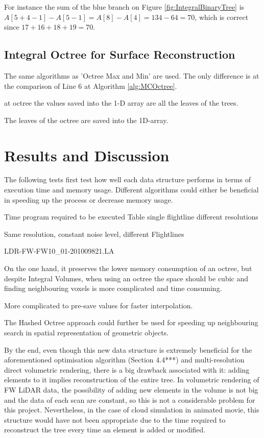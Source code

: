 \documentclass{subfiles}
\begin{document}
\par For instance the sum of the blue branch on Figure \ref{fig:IntegralBinaryTree} is $A[5+4-1]-A[5-1] = A[8]-A[4] = 134-64 = 70$, which is correct since $17+16+18+19=70$.




\subsection{Integral Octree for Surface Reconstruction}

The same algorithms as 'Octree Max and Min' are used. The only difference is at the comparison of Line 6 at Algorithm \ref{alg:MCOctree}. 

at octree the values saved into the 1-D array are all the leaves of the trees. 




The leaves of the octree are saved into the 1D-array. 




\section{Results and Discussion}

The following tests first test how well each data structure performs in terms of execution time and memory usage. 
Different algorithms could either be beneficial in speeding up the process or decrease memory usage. 


Time program required to be executed
Table single flightline different resolutions



Same resolution, constant noise level, different Flightlines



LDR-FW-FW10\_01-201009821.LA



On the one hand, it preserves the lower memory consumption of an octree, but despite Integral Volumes, when using an octree the space should be cubic and finding neighbouring voxels is more complicated and time consuming. 

More complicated to pre-save values for faster interpolation. 

The Hashed Octree approach could further be used for speeding up neighbouring search in spatial representation of geometric objects.

By the end, even though this new data structure is extremely beneficial for the aforementioned optimisation algorithm (Section 4.4***) and multi-resolution direct volumetric rendering, there is a big drawback associated with it: adding elements to it implies reconstruction of the entire tree. In volumetric rendering of FW LiDAR data, the possibility of adding new elements in the volume is not big and the data of each scan are constant, so this is not a considerable problem for this project. Nevertheless, in the case of cloud simulation in animated movie, this structure would have not been appropriate due to the time required to reconstruct the tree every time an element is added or modified. 
\end{document}
